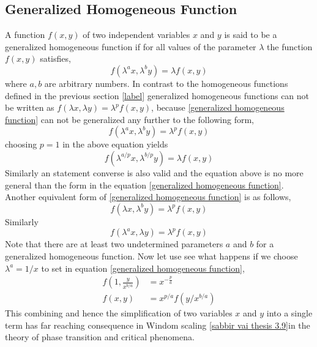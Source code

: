	\subsection{Generalized Homogeneous Function}
	A function $f(x,y)$ of two independent variables $x$ and $y$ is said to be a generalized homogeneous function if for all values of the parameter $\lambda$ the function $f(x,y)$ satisfies,
	\begin{equation}
		f(\lambda^a x, \lambda^b y) = \lambda f(x,y)
		\label{generalized homogeneous function}
	\end{equation}
	where $a,b$ are arbitrary numbers. In contrast to the homogeneous functions defined in the previous section \ref{label} generalized homogeneous functions can not be written as $f(\lambda x, \lambda y) = \lambda^p f(x,y)$, because \ref{generalized homogeneous function} can not be generalized any further to the following form,
	\begin{equation}
		f(\lambda^a x, \lambda^b y) = \lambda^p f(x,y)
	\end{equation}
	choosing $p=1$ in the above equation yields
	\begin{equation}
		f(\lambda^{a/p} x, \lambda^{b/p} y) = \lambda f(x,y)
	\end{equation}
	Similarly an statement converse is also valid and the equation above is no more general than the form in the equation \ref{generalized homogeneous function}. Another equivalent form of \ref{generalized homogeneous function}  is as follows,
	\begin{equation}
		f(\lambda x, \lambda^b y) = \lambda^p f(x,y)
	\end{equation}
	Similarly
	\begin{equation}
		f(\lambda^a x, \lambda y) = \lambda^p f(x,y)
	\end{equation}
	Note that there are at least two undetermined parameters $a$ and $b$ for a generalized homogeneous function. Now let use see what happens if we choose $\lambda^a = 1/x$ to set in equation \ref{generalized homogeneous function},
	\begin{align}
		f(1, \frac{y}{x^{b/a}}) &= x^{-\frac{p}{a}} \\
		f(x,y) &= x^{p/a} f(y/x^{b/a})
	\end{align}
	This combining and hence the simplification of two variables $x$ and $y$ into a single term has far reaching consequence in Windom scaling \ref{sabbir vai thesis 3.9}in the theory of phase transition and critical phenomena.
